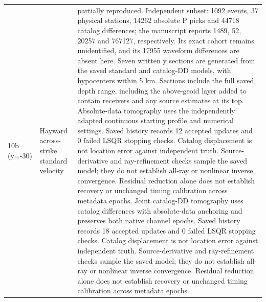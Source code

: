 \begin{longtable}{>{\raggedright\arraybackslash}p{}>{\raggedright\arraybackslash}p{}>{\raggedright\arraybackslash}p{}}
10b (y=-30) & Hayward across-strike standard velocity & partially reproduced. Independent subset: 1092 events, 37 physical stations, 14262 absolute P picks and 44718 catalog differences; the manuscript reports 1489, 52, 20257 and 767127, respectively. Its exact cohort remains unidentified, and its 17955 waveform differences are absent here. Seven written y sections are generated from the saved standard and catalog-DD models, with hypocenters within 5 km. Sections include the full saved depth range, including the above-geoid layer added to contain receivers and any source estimates at its top. Absolute-data tomography uses the independently adapted continuous starting profile and numerical settings. Saved history records 12 accepted updates and 0 failed LSQR stopping checks. Catalog displacement is not location error against independent truth. Source-derivative and ray-refinement checks sample the saved model; they do not establish all-ray or nonlinear inverse convergence. Residual reduction alone does not establish recovery or unchanged timing calibration across metadata epochs. Joint catalog-DD tomography uses catalog differences with absolute-data anchoring and preserves both native channel epochs. Saved history records 18 accepted updates and 0 failed LSQR stopping checks. Catalog displacement is not location error against independent truth. Source-derivative and ray-refinement checks sample the saved model; they do not establish all-ray or nonlinear inverse convergence. Residual reduction alone does not establish recovery or unchanged timing calibration across metadata epochs.\\

\end{longtable}
